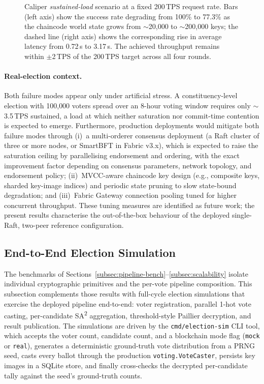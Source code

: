 \begin{figure}[H]
\centering

\caption[Caliper sustained-load scenario: state-bound degradation at fixed 200\,TPS]{Caliper \emph{sustained-load} scenario at a fixed 200\,TPS request rate. Bars (left axis) show the success rate degrading from 100\% to 77.3\% as the chaincode world state grows from $\sim$20{,}000 to $\sim$200{,}000 keys; the dashed line (right axis) shows the corresponding rise in average latency from 0.72\,s to 3.17\,s. The achieved throughput remains within $\pm$2\,TPS of the 200\,TPS target across all four rounds.}
\label{fig:blockchain-sustained}
\end{figure}

\paragraph{Real-election context.} Both failure modes appear only under artificial stress. A constituency-level election with 100{,}000 voters spread over an 8-hour voting window requires only $\sim$3.5\,TPS sustained, a load at which neither saturation nor commit-time contention is expected to emerge. Furthermore, production deployments would mitigate both failure modes through (i)~a multi-orderer consensus deployment (a Raft cluster of three or more nodes, or SmartBFT in Fabric v3.x), which is expected to raise the saturation ceiling by parallelising endorsement and ordering, with the exact improvement factor depending on consensus parameters, network topology, and endorsement policy; (ii)~MVCC-aware chaincode key design (e.g., composite keys, sharded key-image indices) and periodic state pruning to slow state-bound degradation; and (iii)~Fabric Gateway connection pooling tuned for higher concurrent throughput. These tuning measures are identified as future work; the present results characterise the out-of-the-box behaviour of the deployed single-Raft, two-peer reference configuration.

\subsection{End-to-End Election Simulation}
\label{subsec:election-sim}

The benchmarks of Sections~\ref{subsec:pipeline-bench}--\ref{subsec:scalability} isolate individual cryptographic primitives and the per-vote pipeline composition. This subsection complements those results with full-cycle election simulations that exercise the deployed pipeline end-to-end: voter registration, parallel 1-hot vote casting, per-candidate SA\textsuperscript{2} aggregation, threshold-style Paillier decryption, and result publication. The simulations are driven by the \texttt{cmd/election-sim} CLI tool, which accepts the voter count, candidate count, and a blockchain mode flag (\texttt{mock} or \texttt{real}), generates a deterministic ground-truth vote distribution from a PRNG seed, casts every ballot through the production \texttt{voting.VoteCaster}, persists key images in a SQLite store, and finally cross-checks the decrypted per-candidate tally against the seed's ground-truth counts.

